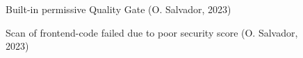 \documentclass[11pt]{article}
\begin{document}
\begin{flushleft}
        \begin{figure}[htb]
            \centering
            \caption{Built-in permissive Quality Gate (O. Salvador, 2023)}
        \end{figure}

        \begin{figure}[htb]
            \centering
            \caption{Scan of frontend-code failed due to poor security score (O. Salvador, 2023)}
        \end{figure}
        
    \clearpage
    

\end{flushleft}
\end{document}
